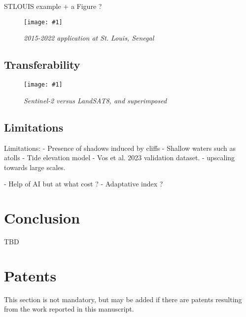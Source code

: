 \documentclass[remotesensing,article,submit,pdftex,moreauthors]{Definitions/mdpi}
\newcommand{\myfigure}[4]{
    \begin{figure*}[ht!]
        \centering
        \texttt{[image: \#1]}	 
        \caption{\itshape#2}
        \label{#3}
    \end{figure*} 
}
\begin{document}
STLOUIS example + a Figure ?

\myfigure{img/senegal_stLouis_thinLines.png}{2015-2022 application at St. Louis, Senegal}{senegal}{1}

\subsection{Transferability}

\myfigure{img/duck_comparison.png}{Sentinel-2 versus LandSAT8, and superimposed}{landsat}{1}




\subsection{Limitations}
Limitations:
- Presence of shadows induced by cliffs
- Shallow waters such as atolls
- Tide elevation model
- Vos et al. 2023 validation dataset.
- upscaling towards large scales. 

- Help of AI but at what cost ?
- Adaptative index ?

\section{Conclusion}
TBD

\section{Patents}

This section is not mandatory, but may be added if there are patents resulting from the work reported in this manuscript.

\vspace{6pt} 


\end{document}
